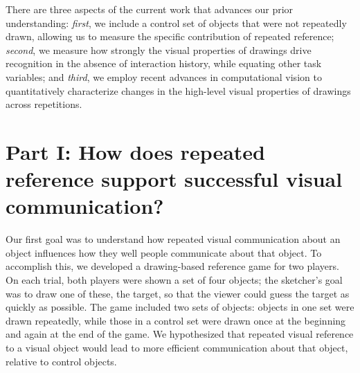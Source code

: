 \documentclass[10pt,letterpaper]{article}
\newcommand{\rdh}[1]{\textcolor{Red}{rdh: #1}}
\begin{document}


There are three aspects of the current work that advances our prior understanding: \emph{first}, we include a control set of objects that were not repeatedly drawn, allowing us to measure the specific contribution of repeated reference; \emph{second}, we measure how strongly the visual properties of drawings drive recognition in the absence of interaction history, while equating other task variables; and \emph{third}, we employ recent advances in computational vision to quantitatively characterize changes in the high-level visual properties of drawings across repetitions. 

\section{Part I: How does repeated reference support successful visual communication?}


Our first goal was to understand how repeated visual communication about an object influences how they well  people communicate about that object.  
To accomplish this, we developed a drawing-based reference game for two players. 
On each trial, both players were shown a set of four objects; the sketcher’s goal was to draw one of these, the target, so that the viewer could guess the target as quickly as possible. 
The game included two sets of objects: objects in one set were drawn repeatedly, while those in a control set were drawn once at the beginning and again at the end of the game.
We hypothesized that repeated visual reference to a visual object would lead to more efficient communication about that object, relative to control objects. 

\end{document}
